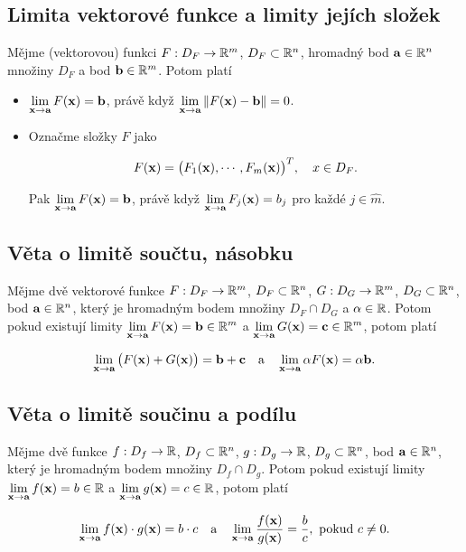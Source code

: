 \subsection*{Limita vektorové funkce a limity jejích složek}

Mějme (vektorovou) funkci $F: D_F \to \mathbb{R}^m$, $D_F \subset \mathbb{R}^n$, hromadný bod
$\mathbf{a} \in \mathbb{R}^n$ množiny $D_F$ a bod $\mathbf{b} \in \mathbb{R}^m$. Potom platí
\begin{itemize}
    \item $\displaystyle\lim_{\mathbf{x} \to \mathbf{a}} F(\mathbf{x}) = \mathbf{b}$, právě když $\displaystyle \lim_{\mathbf{x} \to \mathbf{a}} \| F(\mathbf{x}) - \mathbf{b} \| = 0$.
    \item Označme složky $F$ jako

          \[ F(\mathbf{x}) = \big(F_1(\mathbf{x}), \cdots, F_m(\mathbf{x})\big)^T, \quad x \in D_F. \]

          Pak $\lim\limits_{\mathbf{x} \to \mathbf{a}} F(\mathbf{x}) = \mathbf{b}$, právě když
          $\lim\limits_{\mathbf{x}\to\mathbf{a}} F_j(\mathbf{x}) = b_j$ pro každé $j \in \hat{m}$.
\end{itemize}

\subsection*{Věta o limitě součtu, násobku}

Mějme dvě vektorové funkce $F: D_F \to \mathbb{R}^m$, $D_F \subset \mathbb{R}^n$, $G: D_G \to
    \mathbb{R}^m$, $D_G \subset \mathbb{R}^n$, bod $\mathbf{a} \in \mathbb{R}^n$, který je hromadným bodem množiny
$D_F \cap D_G$ a $\alpha \in \mathbb{R}$. Potom pokud existují limity
$\displaystyle\lim_{\mathbf{x}\to\mathbf{a}} F(\mathbf{x}) = \mathbf{b} \in \mathbb{R}^m$ a
$\displaystyle\lim_{\mathbf{x}\to\mathbf{a}} G(\mathbf{x}) = \mathbf{c} \in \mathbb{R}^m$, potom platí

\[ \lim_{\mathbf{x}\to\mathbf{a}} \big( F(\mathbf{x}) + G(\mathbf{x}) \big) = \mathbf{b} + \mathbf{c}
    \quad \text{a} \quad
    \lim_{\mathbf{x}\to\mathbf{a}} \alpha F(\mathbf{x}) = \alpha \mathbf{b}. \]

\subsection*{Věta o limitě součinu a podílu}

Mějme dvě funkce $f: D_f \to \mathbb{R}$, $D_f \subset \mathbb{R}^n$, $g: D_g \to \mathbb{R}$, $D_g
    \subset \mathbb{R}^n$, bod $\mathbf{a} \in \mathbb{R}^n$, který je hromadným bodem množiny $D_f \cap
    D_g$. Potom pokud existují limity $\displaystyle\lim_{\mathbf{x}\to\mathbf{a}} f(\mathbf{x}) = b \in
    \mathbb{R}$ a $\displaystyle\lim_{\mathbf{x}\to\mathbf{a}} g(\mathbf{x}) = c \in \mathbb{R}$, potom platí

\[ \lim_{\mathbf{x}\to\mathbf{a}} f(\mathbf{x}) \cdot g(\mathbf{x}) = b \cdot c
    \quad \text{a} \quad
    \lim_{\mathbf{x}\to\mathbf{a}} \frac{f(\mathbf{x})}{g(\mathbf{x})} = \frac{b}{c}, \ \text{pokud} \ c \neq 0. \]

